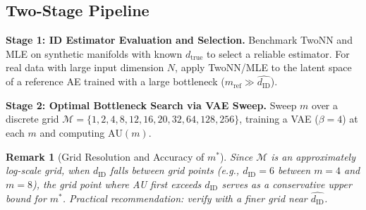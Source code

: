\documentclass[12pt,a4paper]{article}
\newtheorem{remark}{Remark}
\newcommand{\dID}{d_{\mathrm{ID}}}
\newcommand{\dzopt}{m^*}
\newcommand{\dtrue}{d_{\mathrm{true}}}
\begin{document}
\subsection{Two-Stage Pipeline}

\textbf{Stage 1: ID Estimator Evaluation and Selection.}
Benchmark TwoNN and MLE on synthetic manifolds with known $\dtrue$ to select a reliable estimator.
For real data with large input dimension $N$, apply TwoNN/MLE to the latent space of a reference AE trained with a large bottleneck ($m_{\mathrm{ref}} \gg \hat{\dID}$).

\textbf{Stage 2: Optimal Bottleneck Search via VAE Sweep.}
Sweep $m$ over a discrete grid
$\mathcal{M} = \{1, 2, 4, 8, 12, 16, 20, 32, 64, 128, 256\}$,
training a VAE ($\beta=4$) at each $m$ and computing $\mathrm{AU}(m)$.

\begin{remark}[Grid Resolution and Accuracy of $\dzopt$]\label{rem:grid_resolution}
Since $\mathcal{M}$ is an approximately log-scale grid, when $\dID$ falls between grid points (e.g., $\dID = 6$ between $m=4$ and $m=8$), the grid point where AU first exceeds $\dID$ serves as a conservative upper bound for $m^*$.
Practical recommendation: verify with a finer grid near $\hat{\dID}$.
\end{remark}
\end{document}
